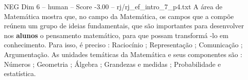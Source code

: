\begin{textsample}{NEG Dim 6 – human – Score -3.00 – rj/rj\_ef\_intro\_7\_p4.txt}  \label{ex:f6_neg_009}
A área de Matemática mostra que, no campo da Matemática, os campos que a compõe reúnem um grupo de ideias fundamentais, que são importantes para desenvolver nos \textbf{alunos} o pensamento matemático, para que possam transformá -lo em conhecimento.
Para isso, é preciso : Raciocínio ; Representação ; Comunicação ; Argumentação.
As unidades temáticas da Matemática e seus componentes são : Números ; Geometria ; Álgebra ; Grandezas e medidas ; Probabilidade e estatística.

\end{textsample}
